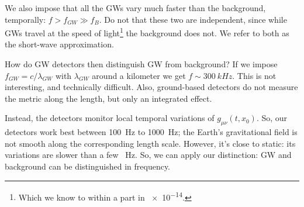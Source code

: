 \documentclass[main.tex]{subfiles}
\begin{document}
We also impose that all the GWs vary much faster than the background, temporally: \(f > f_{GW} \gg f_B\). 
Do not that these two are independent, since while GWs travel at the speed of light\footnote{Which we know to within a part in \num{e-14}.} the background does not. 
We refer to both as the short-wave approximation. 

How do GW detectors then distinguish GW from background? 
If we impose \(f_{GW} = c / \lambda_{GW}\) with \(\lambda_{GW}\) around a kilometer we get \(f \sim \SI{300}{kHz}\). This is not interesting, and technically difficult. 
Also, ground-based detectors do not measure the metric along the length, but only an integrated effect. 

Instead, the detectors monitor local temporal variations of \(g_{\mu \nu } (t, x_0 )\). 
So, our detectors work best between \SI{100}{Hz} to \SI{1000}{Hz}; the Earth's gravitational field is not smooth along the corresponding length scale. However, it's close to static: its variations are slower than a few \SI{}{Hz}.
So, we can apply our distinction: GW and background can be distinguished in frequency. 
\end{document}
